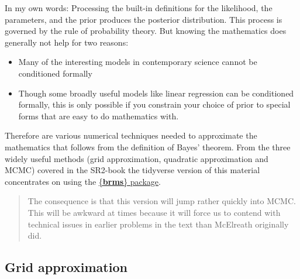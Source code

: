 \documentclass[
  letterpaper,
  DIV=11,
  numbers=noendperiod]{scrreprt}
\providecommand{\tightlist}{%
  \setlength{\itemsep}{0pt}\setlength{\parskip}{0pt}}\usepackage{longtable,booktabs,array}
\begin{document}
In my own words: Processing the built-in definitions for the likelihood,
the parameters, and the prior produces the posterior distribution. This
process is governed by the rule of probability theory. But knowing the
mathematics does generally not help for two reasons:

\begin{itemize}
\tightlist
\item
  Many of the interesting models in contemporary science cannot be
  conditioned formally
\item
  Though some broadly useful models like linear regression can be
  conditioned formally, this is only possible if you constrain your
  choice of prior to special forms that are easy to do mathematics with.
\end{itemize}

Therefore are various numerical techniques needed to approximate the
mathematics that follows from the definition of Bayes' theorem. From the
three widely useful methods (grid approximation, quadratic approximation
and MCMC) covered in the SR2-book the tidyverse version of this material
concentrates on using the
\href{https://paul-buerkner.github.io/brms/}{\{\textbf{brms}\} package}.

\begin{tcolorbox}[enhanced jigsaw, colframe=quarto-callout-caution-color-frame, colback=white, toprule=.15mm, breakable, arc=.35mm, bottomtitle=1mm, colbacktitle=quarto-callout-caution-color!10!white, toptitle=1mm, titlerule=0mm, title=\textcolor{quarto-callout-caution-color}{\faFire}\hspace{0.5em}{Jumping quickly into MCMC}, leftrule=.75mm, opacityback=0, rightrule=.15mm, opacitybacktitle=0.6, bottomrule=.15mm, left=2mm, coltitle=black]

\begin{quote}
The consequence is that this version will jump rather quickly into MCMC.
This will be awkward at times because it will force us to contend with
technical issues in earlier problems in the text than McElreath
originally did.
\end{quote}

\end{tcolorbox}

\hypertarget{grid-approximation}{%
\subsection{Grid approximation}\label{grid-approximation}}
\end{document}
